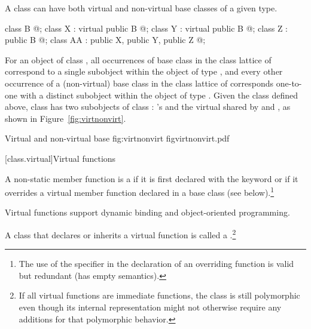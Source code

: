 \pnum
\begin{note}
A class can have both virtual and non-virtual base classes of a given
type.
\begin{codeblock}
class B { @\commentellip@ };
class X : virtual public B { @\commentellip@ };
class Y : virtual public B { @\commentellip@ };
class Z : public B { @\commentellip@ };
class AA : public X, public Y, public Z { @\commentellip@ };
\end{codeblock}
For an object of class , all  occurrences of
base class  in the class lattice of  correspond to a
single  subobject within the object of type , and
every other occurrence of a (non-virtual) base class  in the
class lattice of  corresponds one-to-one with a distinct
 subobject within the object of type . Given the
class  defined above, class  has two subobjects of
class : 's  and the virtual  shared
by  and , as shown in Figure~\ref{fig:virtnonvirt}.

%
%
%
\begin{importgraphic}
{Virtual and non-virtual base}
{fig:virtnonvirt}
{figvirtnonvirt.pdf}
\end{importgraphic}
\end{note}

[class.virtual]{Virtual functions}%
%
%

\pnum
A non-static member function is a 
if it is first declared with the keyword  or
if it overrides a virtual member function declared in a base class
(see below).\footnote{The use of the  specifier in the
declaration of an overriding function is valid but redundant (has empty
semantics).}
\begin{note}
Virtual functions support dynamic binding and object-oriented
programming. \end{note} A class that declares or inherits a virtual function is
called a .\footnote{If
all virtual functions are immediate functions,
the class is still polymorphic even though
its internal representation might not otherwise require
any additions for that polymorphic behavior.}

